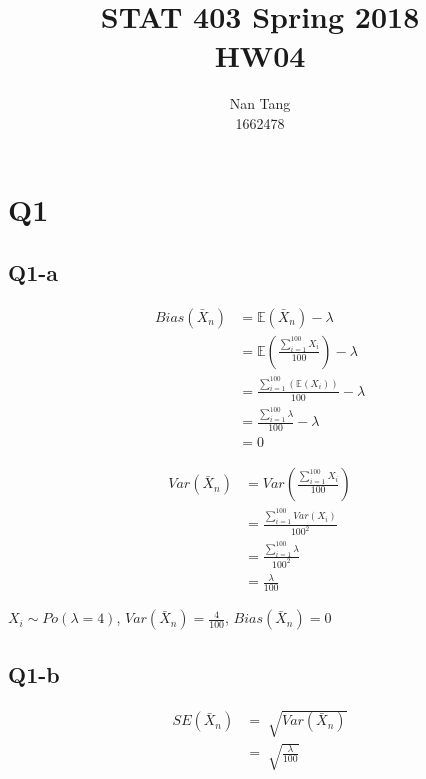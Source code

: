 \documentclass[12pt,letterpaper]{article}
\author{Nan Tang\\1662478}
\title{STAT 403 Spring 2018\\HW04}
\begin{document}
\maketitle

\section*{Q1}

\subsection*{Q1-a}
\begin{align*}
Bias(\bar{X}_n) &= \mathbb{E}(\bar{X}_n) - \lambda \\
&= \mathbb{E}(\frac{\sum_{i=1}^{100}X_i}{100}) - \lambda \\
&= \frac{\sum_{i=1}^{100}(\mathbb{E}(X_i))}{100} - \lambda \\
&= \frac{\sum_{i=1}^{100}\lambda}{100} - \lambda \\
&= 0
\end{align*}

\begin{align*}
Var(\bar{X}_n) &= Var(\frac{\sum_{i=1}^{100}X_i}{100}) \\
&= \frac{\sum_{i=1}^{100}Var(X_i)}{100^2} \\
&= \frac{\sum_{i=1}^{100} \lambda}{100^2} \\
&= \frac{\lambda}{100}
\end{align*}

\noindent $X_i \sim Po(\lambda = 4)$, $Var(\bar{X}_n) = \frac{4}{100}$, $Bias(\bar{X}_n) = 0$

\newpage
\subsection*{Q1-b}
\begin{align*}
SE(\bar{X}_n) &= \sqrt[]{Var(\bar{X}_n)} \\
&= \sqrt[]{\frac{\lambda}{100}}
\end{align*}
\end{document}
